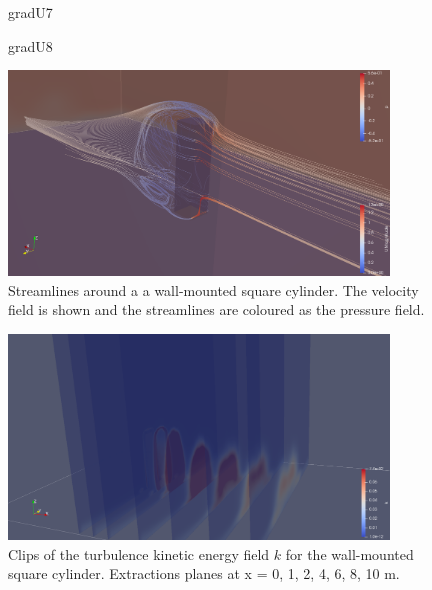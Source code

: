 \begin{figure}[H]
    \caption{gradU7}%
    \qquad
    \caption{gradU8}%
    \label{fig:sqcyl:gradu}%
\end{figure}

\begin{figure}[H]%
    \centering
    \includegraphics[width=0.9\textwidth]{figs/streamlines.png}
    \caption{Streamlines around a  a wall-mounted square cylinder. The velocity field is shown and the streamlines are coloured as the pressure field.}
    \label{fig:streamlines}%
\end{figure}

\begin{figure}[H]%
    \centering
    \includegraphics[width=0.9\textwidth]{figs/sqcyl/gradU/k_clips.png}
    \caption{Clips of the turbulence kinetic energy field $k$ for the wall-mounted square cylinder. Extractions planes at x = 0, 1, 2, 4, 6, 8, 10 m.}
    \label{fig:k_clips}%
\end{figure}

